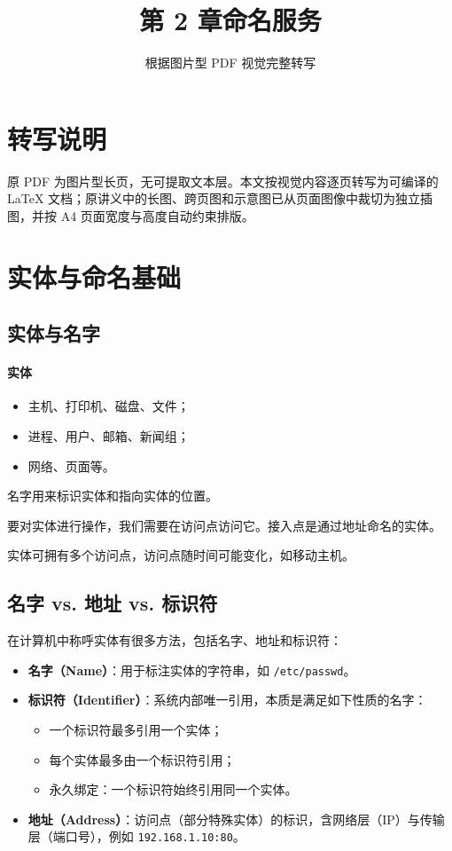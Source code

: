 \documentclass[UTF8,a4paper,11pt]{ctexart}
\title{第 2 章\quad 命名服务}
\author{根据图片型 PDF 视觉完整转写}
\date{}
\begin{document}
\maketitle
\tableofcontents
\newpage

\section*{转写说明}
原 PDF 为图片型长页，无可提取文本层。本文按视觉内容逐页转写为可编译的 \LaTeX{} 文档；原讲义中的长图、跨页图和示意图已从页面图像中裁切为独立插图，并按 A4 页面宽度与高度自动约束排版。

\section{实体与命名基础}

\subsection{实体与名字}

\paragraph{实体}
\begin{itemize}
  \item 主机、打印机、磁盘、文件；
  \item 进程、用户、邮箱、新闻组；
  \item 网络、页面等。
\end{itemize}

名字用来标识实体和指向实体的位置。

要对实体进行操作，我们需要在访问点访问它。接入点是通过地址命名的实体。

实体可拥有多个访问点，访问点随时间可能变化，如移动主机。

\subsection{名字 vs. 地址 vs. 标识符}

在计算机中称呼实体有很多方法，包括名字、地址和标识符：
\begin{itemize}
  \item \textbf{名字（Name）}：用于标注实体的字符串，如 \texttt{/etc/passwd}。
  \item \textbf{标识符（Identifier）}：系统内部唯一引用，本质是满足如下性质的名字：
  \begin{itemize}
    \item 一个标识符最多引用一个实体；
    \item 每个实体最多由一个标识符引用；
    \item 永久绑定：一个标识符始终引用同一个实体。
  \end{itemize}
  \item \textbf{地址（Address）}：访问点（部分特殊实体）的标识，含网络层（IP）与传输层（端口号），例如 \texttt{192.168.1.10:80}。
\end{itemize}
\end{document}
